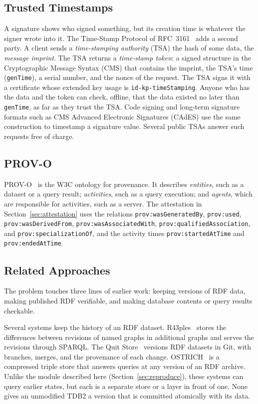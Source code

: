 \documentclass[11pt,a4paper]{article}
\newcommand{\code}[1]{\texttt{#1}}
\begin{document}
\subsection{Trusted Timestamps}
\label{sec:tsp}

A signature shows who signed something, but its creation time is whatever the signer wrote
into it. The Time-Stamp Protocol of RFC~3161~\cite{rfc3161} adds a second party. A client sends a
\emph{time-stamping authority} (TSA) the hash of some data, the \emph{message imprint}. The TSA
returns a \emph{time-stamp token}: a signed structure in the Cryptographic Message Syntax
(CMS) that contains the imprint, the
TSA's time (\code{genTime}), a serial number, and the nonce of the request. The TSA signs it
with a certificate whose extended key usage is \code{id-kp-timeStamping}. Anyone who has the data and
the token can check, offline, that the data existed no later than \code{genTime}, as far as they
trust the TSA. Code signing and long-term signature formats such as CMS Advanced Electronic
Signatures (CAdES) use the same construction to timestamp a signature value. Several public
TSAs answer such requests free of charge.

\subsection{PROV-O}
\label{sec:provo}

PROV-O~\cite{provo} is the W3C ontology for provenance. It describes \emph{entities}, such as
a dataset or a query result; \emph{activities}, such as a query execution; and \emph{agents},
which are responsible for activities, such as a server. The attestation in
Section~\ref{sec:attestation} uses the relations \code{prov:wasGeneratedBy}, \code{prov:used},
\code{prov:wasDerivedFrom}, \code{prov:wasAssociatedWith}, \code{prov:qualifiedAssociation}, and
\code{prov:specializationOf}, and the activity times \code{prov:startedAtTime} and
\code{prov:endedAtTime}.

\subsection{Related Approaches}
\label{sec:related}

The problem touches three lines of earlier work: keeping versions of RDF data, making
published RDF verifiable, and making database contents or query results checkable.

Several systems keep the history of an RDF dataset. R43ples~\cite{r43ples} stores the
differences between revisions of named graphs in additional graphs and serves the revisions
through SPARQL. The Quit Store~\cite{quitstore} versions RDF datasets in Git, with branches,
merges, and the provenance of each change. OSTRICH~\cite{ostrich} is a compressed triple store
that answers queries at any version of an RDF archive. Unlike the module described here
(Section~\ref{sec:reproduce}), these systems can query earlier states, but each is a separate
store or a layer in front of one. None gives an unmodified TDB2 a version that is committed
atomically with its data.
\end{document}
